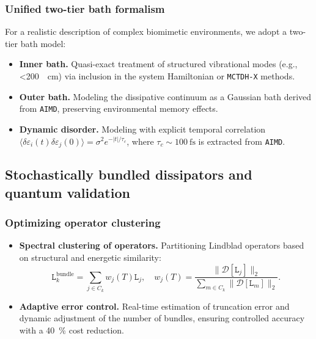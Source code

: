 \documentclass[12pt, a4paper]{article}
\begin{document}
\subsubsection{Unified two-tier bath formalism}

For a realistic description of complex biomimetic environments, we adopt a two-tier bath model:

\begin{itemize}
    \item \textbf{Inner bath.} Quasi-exact treatment of structured vibrational modes (e.g., \SI{<200}{\per\centi\meter}) via inclusion in the system Hamiltonian or \texttt{MCTDH-X} methods.
    
    \item \textbf{Outer bath.} Modeling the dissipative continuum as a Gaussian bath derived from \texttt{AIMD}, preserving environmental memory effects.
    
    \item \textbf{Dynamic disorder.} Modeling with explicit temporal correlation $\langle \delta \varepsilon_i(t) \delta \varepsilon_j(0) \rangle = \sigma^2 e^{-|t|/\tau_c}$, where $\tau_c \sim \SI{100}{\femto\second}$ is extracted from \texttt{AIMD}.
\end{itemize}

\subsection{Stochastically bundled dissipators and quantum validation}

\subsubsection{Optimizing operator clustering}

\begin{itemize}
    \item \textbf{Spectral clustering of operators.} Partitioning Lindblad operators based on structural and energetic similarity:
    \begin{equation}
    \mathtt{L}_k^{\text{bundle}} = \sum_{j \in C_k} w_j(T) \mathtt{L}_j, \quad w_j(T) = \frac{\|\mathcal{D}[\mathtt{L}_j]\|_2}{\sum_{m\in C_k} \|\mathcal{D}[\mathtt{L}_m]\|_2}.
    \end{equation}
    
    \item \textbf{Adaptive error control.} Real-time estimation of truncation error and dynamic adjustment of the number of bundles, ensuring controlled accuracy with a \SI{40}{\percent} cost reduction.
\end{itemize}
\end{document}
